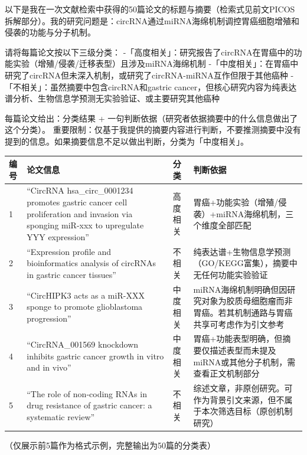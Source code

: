 \begin{userbox}
以下是我在一次文献检索中获得的50篇论文的标题与摘要（检索式见前文PICOS拆解部分）。我的研究问题是：circRNA通过miRNA海绵机制调控胃癌细胞增殖和侵袭的功能与分子机制。

请将每篇论文按以下三级分类：
-「高度相关」：研究报告了circRNA在胃癌中的功能实验（增殖/侵袭/迁移表型）且涉及miRNA海绵机制
-「中度相关」：在胃癌中研究了circRNA但未深入机制，或研究了circRNA-miRNA互作但限于其他癌种
-「不相关」：虽然摘要中包含circRNA和gastric cancer，但核心研究内容为纯表达谱分析、生物信息学预测无实验验证、或主要研究其他癌种

每篇论文给出：分类结果 + 一句判断依据（研究者依据摘要中的什么信息做出了这个分类）。
重要限制：仅基于我提供的摘要内容进行判断，不要推测摘要中没有提到的信息。如果摘要信息不足以做出判断，分类为「中度相关」。
\end{userbox}

\begin{aibox}
\begin{formalTable}[H]
\begin{tabular}{p{2.5cm} p{4.0cm} p{4.0cm} p{3.0cm}}
\toprule
\textbf{编号} & \textbf{论文信息} & \textbf{分类} & \textbf{判断依据} \\
\midrule
1 & ``CircRNA hsa\_circ\_0001234 promotes gastric cancer cell proliferation and invasion via sponging miR-xxx to upregulate YYY expression'' & 高度相关 & 胃癌+功能实验（增殖/侵袭）+miRNA海绵机制，三个维度全部匹配 \\
2 & ``Expression profile and bioinformatics analysis of circRNAs in gastric cancer tissues'' & 不相关 & 纯表达谱+生物信息学预测（GO/KEGG富集），摘要中无任何功能实验验证 \\
3 & ``CircHIPK3 acts as a miR-XXX sponge to promote glioblastoma progression'' & 中度相关 & miRNA海绵机制明确但因研究对象为胶质母细胞瘤而非胃癌。若其机制通路与胃癌共享可考虑作为引文参考 \\
4 & ``CircRNA\_001569 knockdown inhibits gastric cancer growth in vitro and in vivo'' & 中度相关 & 胃癌+功能表型明确，但摘要仅描述表型而未提及miRNA或其他分子机制，需查看正文机制部分 \\
5 & ``The role of non-coding RNAs in drug resistance of gastric cancer: a systematic review'' & 不相关 & 综述文章，非原创研究。可作为背景引文来源，但不属于本次筛选目标（原创机制研究） \\
\bottomrule
\end{tabular}
\end{formalTable}

（仅展示前5篇作为格式示例，完整输出为50篇的分类表）
\end{aibox}

